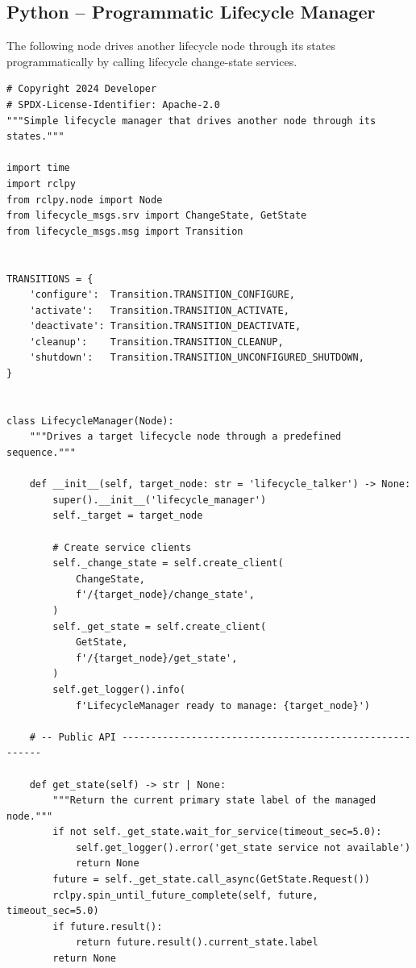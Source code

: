 \documentclass[11pt,a4paper]{csarticle}
\begin{document}
\subsection{Python -- Programmatic Lifecycle Manager}
\label{sec:py-manager}

The following node drives another lifecycle node through its states
programmatically by calling lifecycle change-state services.

\begin{lstlisting}[style=python,caption={lifecycle\_manager.py}]
# Copyright 2024 Developer
# SPDX-License-Identifier: Apache-2.0
"""Simple lifecycle manager that drives another node through its states."""

import time
import rclpy
from rclpy.node import Node
from lifecycle_msgs.srv import ChangeState, GetState
from lifecycle_msgs.msg import Transition


TRANSITIONS = {
    'configure':  Transition.TRANSITION_CONFIGURE,
    'activate':   Transition.TRANSITION_ACTIVATE,
    'deactivate': Transition.TRANSITION_DEACTIVATE,
    'cleanup':    Transition.TRANSITION_CLEANUP,
    'shutdown':   Transition.TRANSITION_UNCONFIGURED_SHUTDOWN,
}


class LifecycleManager(Node):
    """Drives a target lifecycle node through a predefined sequence."""

    def __init__(self, target_node: str = 'lifecycle_talker') -> None:
        super().__init__('lifecycle_manager')
        self._target = target_node

        # Create service clients
        self._change_state = self.create_client(
            ChangeState,
            f'/{target_node}/change_state',
        )
        self._get_state = self.create_client(
            GetState,
            f'/{target_node}/get_state',
        )
        self.get_logger().info(
            f'LifecycleManager ready to manage: {target_node}')

    # -- Public API --------------------------------------------------------

    def get_state(self) -> str | None:
        """Return the current primary state label of the managed node."""
        if not self._get_state.wait_for_service(timeout_sec=5.0):
            self.get_logger().error('get_state service not available')
            return None
        future = self._get_state.call_async(GetState.Request())
        rclpy.spin_until_future_complete(self, future, timeout_sec=5.0)
        if future.result():
            return future.result().current_state.label
        return None


\end{lstlisting}
\end{document}
